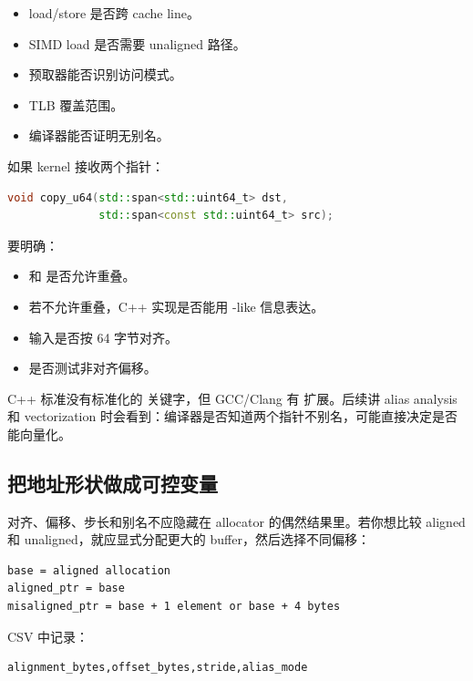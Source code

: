 \begin{itemize}
  \item load/store 是否跨 cache line。
  \item SIMD load 是否需要 unaligned 路径。
  \item 预取器能否识别访问模式。
  \item TLB 覆盖范围。
  \item 编译器能否证明无别名。
\end{itemize}

如果 kernel 接收两个指针：

\begin{lstlisting}[language=C++]
void copy_u64(std::span<std::uint64_t> dst,
              std::span<const std::uint64_t> src);
\end{lstlisting}

要明确：

\begin{itemize}
  \item {} 和  是否允许重叠。
  \item 若不允许重叠，C++ 实现是否能用 -like 信息表达。
  \item 输入是否按 64 字节对齐。
  \item 是否测试非对齐偏移。
\end{itemize}

\begin{deepdive}
C++ 标准没有标准化的  关键字，但 GCC/Clang 有  扩展。后续讲 alias analysis 和 vectorization 时会看到：编译器是否知道两个指针不别名，可能直接决定是否能向量化。
\end{deepdive}

\subsection{把地址形状做成可控变量}

对齐、偏移、步长和别名不应隐藏在 allocator 的偶然结果里。若你想比较 aligned 和 unaligned，就应显式分配更大的 buffer，然后选择不同偏移：

\begin{lstlisting}
base = aligned allocation
aligned_ptr = base
misaligned_ptr = base + 1 element or base + 4 bytes
\end{lstlisting}

CSV 中记录：

\begin{lstlisting}
alignment_bytes,offset_bytes,stride,alias_mode
\end{lstlisting}

